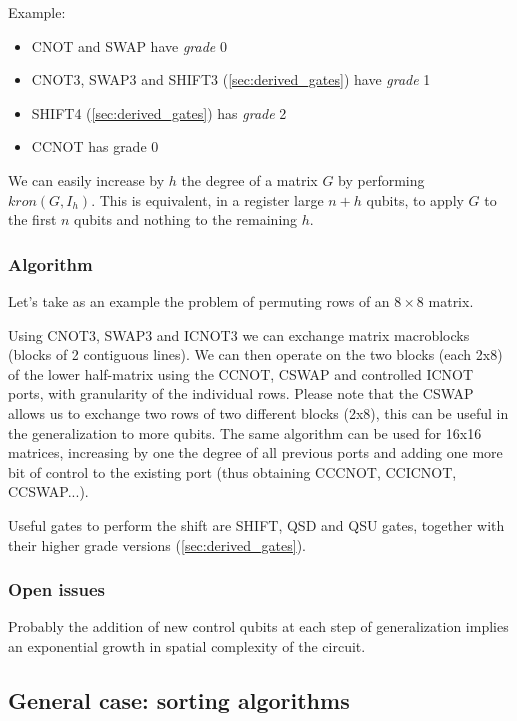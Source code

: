 \bigskip

Example:
\begin{itemize}
	\item CNOT and SWAP have \textit{grade} 0
	\item CNOT3, SWAP3 and SHIFT3 (\cref{sec:derived_gates}) have \textit{grade} 1
	\item SHIFT4 (\cref{sec:derived_gates}) has \textit{grade} 2
	\item CCNOT has grade 0
\end{itemize}

We can easily increase by $h$ the degree of a matrix $G$ by performing $kron(G, I_h)$. This is equivalent, in a register large $n+h$ qubits, to apply $G$ to the first $n$ qubits and nothing to the remaining $h$.

\subsubsection{Algorithm}

Let's take as an example the problem of permuting rows of an $8 \times 8$ matrix.

Using CNOT3, SWAP3 and ICNOT3 we can exchange matrix macroblocks (blocks of 2 contiguous lines). We can then operate on the two blocks (each 2x8) of the lower half-matrix using the CCNOT, CSWAP and controlled ICNOT ports, with granularity of the individual rows. Please note that the CSWAP allows us to exchange two rows of two different blocks (2x8), this can be useful in the generalization to more qubits. The same algorithm can be used for 16x16 matrices, increasing by one the degree of all previous ports and adding one more bit of control to the existing port (thus obtaining CCCNOT, CCICNOT, CCSWAP...).

Useful gates to perform the shift are SHIFT, QSD and QSU gates, together with their higher grade versions (\cref{sec:derived_gates}).

\subsubsection{Open issues}

Probably the addition of new control qubits at each step of generalization implies an exponential growth in spatial complexity of the circuit.

\subsection{General case: sorting algorithms}

